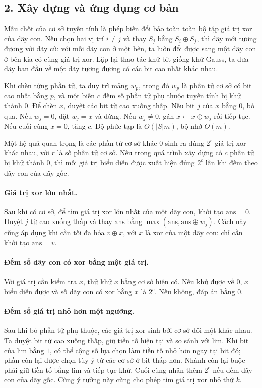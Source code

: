 \documentclass[11pt]{article}
\begin{document}
\subsection*{2. Xây dựng và ứng dụng cơ bản}

Mấu chốt của cơ sở tuyến tính là phép biến đổi bảo toàn toàn bộ tập giá trị xor
của dãy con. Nếu chọn hai vị trí \(i\ne j\) và thay \(S_j\) bằng
\(S_i\oplus S_j\), thì dãy mới tương đương với dãy cũ: với mỗi dãy con ở một
bên, ta luôn đổi được sang một dãy con ở bên kia có cùng giá trị xor. Lặp lại
thao tác khử bit giống khử Gauss, ta đưa dãy ban đầu về một dãy tương đương có
các bit cao nhất khác nhau.

Khi chèn từng phần tử, ta duy trì mảng \(w_p\), trong đó \(w_p\) là phần tử cơ
sở có bit cao nhất bằng \(p\), và một biến \(c\) đếm số phần tử phụ thuộc tuyến
tính bị khử thành \(0\). Để chèn \(x\), duyệt các bit từ cao xuống thấp. Nếu
bit \(j\) của \(x\) bằng \(0\), bỏ qua. Nếu \(w_j=0\), đặt \(w_j=x\) và dừng.
Nếu \(w_j\ne0\), gán \(x\leftarrow x\oplus w_j\) rồi tiếp tục. Nếu cuối cùng
\(x=0\), tăng \(c\). Độ phức tạp là \(O(|S|m)\), bộ nhớ \(O(m)\).

Một hệ quả quan trọng là các phần tử cơ sở khác \(0\) sinh ra đúng \(2^r\) giá
trị xor khác nhau, với \(r\) là số phần tử cơ sở. Nếu trong quá trình xây dựng
có \(c\) phần tử bị khử thành \(0\), thì mỗi giá trị biểu diễn được xuất hiện
đúng \(2^c\) lần khi đếm theo dãy con của dãy gốc.

\paragraph{Giá trị xor lớn nhất.}
Sau khi có cơ sở, để tìm giá trị xor lớn nhất của một dãy con, khởi tạo
\(\mathrm{ans}=0\). Duyệt \(j\) từ cao xuống thấp và thay
\(\mathrm{ans}\) bằng \(\max(\mathrm{ans},\mathrm{ans}\oplus w_j)\). Cách này
cũng áp dụng khi cần tối đa hóa \(v\oplus x\), với \(x\) là xor của một dãy con:
chỉ cần khởi tạo \(\mathrm{ans}=v\).

\paragraph{Đếm số dãy con có xor bằng một giá trị.}
Với giá trị cần kiểm tra \(x\), thử khử \(x\) bằng cơ sở hiện có. Nếu khử được
về \(0\), \(x\) biểu diễn được và số dãy con có xor bằng \(x\) là \(2^c\). Nếu
không, đáp án bằng \(0\).

\paragraph{Đếm số giá trị nhỏ hơn một ngưỡng.}
Sau khi bỏ phần tử phụ thuộc, các giá trị xor sinh bởi cơ sở đôi một khác nhau.
Ta duyệt bit từ cao xuống thấp, giữ tiền tố hiện tại và so sánh với
\(\mathrm{lim}\). Khi bit của \(\mathrm{lim}\) bằng \(1\), có thể cộng số lựa
chọn làm tiền tố nhỏ hơn ngay tại bit đó; phần còn lại được chọn tùy ý từ các
cơ sở ở bit thấp hơn. Nhánh còn lại buộc phải giữ tiền tố bằng
\(\mathrm{lim}\) và tiếp tục khử. Cuối cùng nhân thêm \(2^c\) nếu đếm dãy con
của dãy gốc. Cùng ý tưởng này cũng cho phép tìm giá trị xor nhỏ thứ \(k\).
\end{document}
